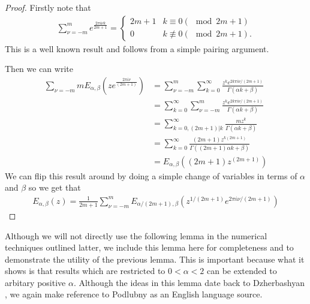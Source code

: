 \begin{proof}
    Firstly note that
    \begin{align}
        \label{eq:sum_identity_1}
        \sum_{\nu=-m}^{m} e^{\frac{2\pi i \nu k}{2m+1}} = 
            \begin{cases}
                2m + 1 & k \equiv 0 (\mod 2m+1) \\
                0 & k \not\equiv 0 (\mod 2m+1).
            \end{cases}
    \end{align}
    This is a well known result and follows from a simple pairing argument.
    
    Then we can write
    \begin{align}
        \sum_{\nu = -m}{m} E_{\alpha,\beta}\left(ze^\frac{2\pi i \nu}{(2m+1)} \right)
            &= \sum_{\nu=-m}^{m} \sum_{k=0}^\infty \frac{z^ke^{2k\pi i\nu / (2m+1)}}{\Gamma(\alpha k + \beta)} \\
            &= \sum_{k=0}^\infty \sum_{\nu=-m}^{m} \frac{z^ke^{2k\pi i\nu / (2m+1)}}{\Gamma(\alpha k + \beta)} \\
            &= \sum_{k=0, (2m + 1) | k}^\infty \frac{mz^k}{\Gamma(\alpha k + \beta)} \\
            &= \sum_{k=0}^\infty \frac{(2m+1)z^{k(2m+1)}}{\Gamma((2m+1)\alpha k + \beta)} \\
            &= E_{\alpha, \beta}((2m+1)z^{(2m+1)})
    \end{align}
    We can flip this result around by doing a simple change of variables in terms of $ \alpha $ and $ \beta $ so we get that
    \begin{align}
        E_{\alpha, \beta}(z) = \frac{1}{2m+1} \sum_{\nu = -m}^{m} E_{\alpha / (2m+1), \beta}\left(z^{1/(2m+1)}e^{2\pi i \nu / (2m+1)}\right)
    \end{align}
\end{proof}

Although we will not directly use the following lemma in the numerical techniques outlined latter, we include this lemma here for completeness and to demonstrate the utility of the previous lemma. This is important because what it shows is that results which are restricted to $ 0 < \alpha < 2 $ can be extended to arbitary positive $ \alpha $. Although the ideas in this lemma date back to Dzherbashyan \cite{Dzherbashyan1954}, we again make reference to Podlubny \cite{Podlubny1999} as an English language source. 

